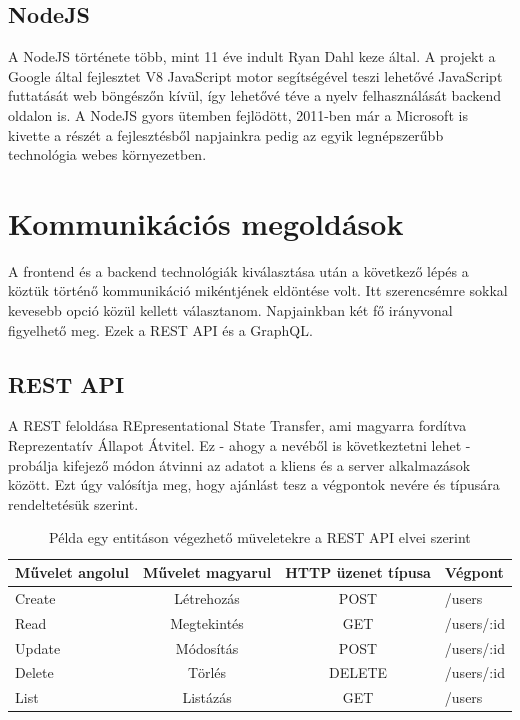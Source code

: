 \subsection{NodeJS}
A NodeJS története több, mint 11 éve indult Ryan Dahl keze által. A projekt a Google által fejlesztet V8 JavaScript motor segítségével teszi lehetővé JavaScript futtatását web böngészőn kívül, így lehetővé téve a nyelv felhasználását backend oldalon is. A NodeJS gyors ütemben fejlödött, 2011-ben már a Microsoft is kivette a részét a fejlesztésből napjainkra pedig az egyik legnépszerűbb technológia webes környezetben.

\section{Kommunikációs megoldások}

A frontend és a backend technológiák kiválasztása után a következő lépés a köztük történő kommunikáció mikéntjének eldöntése volt.
Itt szerencsémre sokkal kevesebb opció közül kellett választanom. Napjainkban két fő irányvonal figyelhető meg. Ezek a REST API és a GraphQL.

\subsection{REST API}
A REST feloldása REpresentational State Transfer, ami magyarra fordítva Reprezentatív Állapot Átvitel. Ez - ahogy a nevéből is következtetni lehet - probálja kifejező módon átvinni az adatot a kliens és a server alkalmazások között.
Ezt úgy valósítja meg, hogy ajánlást tesz a végpontok nevére és típusára rendeltetésük szerint.

\begin{table}[ht]
	\footnotesize
	\centering
	\begin{tabular}{ l c c l }
		\toprule
		Művelet angolul & Művelet magyarul & HTTP üzenet típusa & Végpont \\
		\midrule
		Create & Létrehozás & POST & /users \\
		Read & Megtekintés & GET & /users/:id \\
		Update & Módosítás  & POST & /users/:id \\
		Delete & Törlés  &  DELETE & /users/:id \\
		List & Listázás  & GET & /users \\
		\bottomrule
	\end{tabular}
	\caption{Példa egy entitáson végezhető müveletekre a REST API elvei szerint}
	\label{tab:RESTTable}
\end{table}


